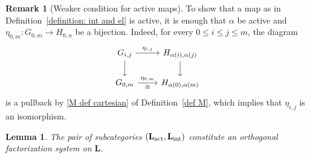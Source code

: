 \documentclass{amsart}
\numberwithin{theorem}{subsection}
\newtheorem{lemma}[theorem]{Lemma}
\theoremstyle{definition}
\newtheorem{remark}[theorem]{Remark}
\newcommand{\name}[1]{\ensuremath{\text{\textup{#1}}}}
\newcommand{\levelg}{\mathbf{L}}
\newcommand{\levelint}{\levelg_{\name{int}}}
\begin{document}
\begin{remark}[Weaker condition for active maps]\label{remark weaker active maps}
To show that a map as in Definition~\ref{definition: int and el} is active, it is enough that $\alpha$ be active and $\eta_{0,m} \colon G_{0,m} \to H_{0,n}$ be a bijection.
Indeed, for every $0\leq i \leq j \leq m$, the diagram
\[ \begin{tikzcd}
G_{i,j} \rar{\eta_{i,j}} \dar & H_{\alpha(i),\alpha(j)} \dar \\
G_{0,m} \rar["\eta_{0,m}", "\cong" swap] & H_{\alpha(0),\alpha(m)}
\end{tikzcd} \]
is a pullback by \eqref{M def cartesian} of Definition~\ref{def M}, which implies that $\eta_{i,j}$ is an isomorphism.
\end{remark}

\begin{lemma}\label{lem Lfs}
The pair of subcategories $(\levelg_{\name{act}},\levelint)$ constitute an orthogonal factorization system on $\levelg$.
\end{lemma}
\end{document}
